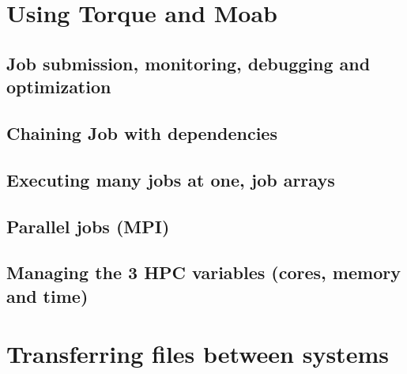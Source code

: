 \section{Using Torque and Moab}
\subsection{Job submission, monitoring, debugging and optimization}
\subsection{Chaining Job with dependencies}
\subsection{Executing many jobs at one, job arrays}
\subsection{Parallel jobs (MPI)}
\subsection{Managing the 3 HPC variables (cores, memory and time)}

\section{Transferring files between systems}
